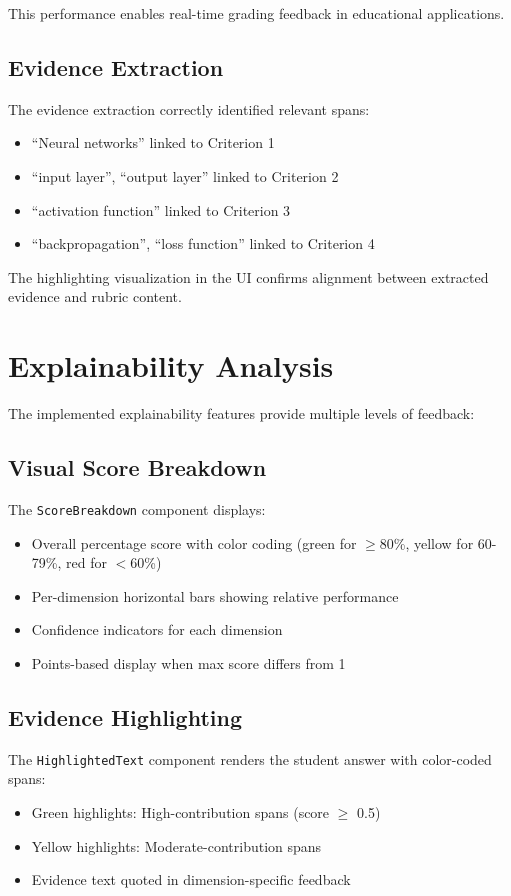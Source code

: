 \documentclass[conference]{IEEEtran}
\begin{document}
This performance enables real-time grading feedback in educational applications.

\subsection{Evidence Extraction}
The evidence extraction correctly identified relevant spans:
\begin{itemize}
    \item ``Neural networks'' linked to Criterion 1
    \item ``input layer'', ``output layer'' linked to Criterion 2
    \item ``activation function'' linked to Criterion 3
    \item ``backpropagation'', ``loss function'' linked to Criterion 4
\end{itemize}

The highlighting visualization in the UI confirms alignment between extracted evidence and rubric content.

\section{Explainability Analysis}
The implemented explainability features provide multiple levels of feedback:

\subsection{Visual Score Breakdown}
The \texttt{ScoreBreakdown} component displays:
\begin{itemize}
    \item Overall percentage score with color coding (green for $\geq$80\%, yellow for 60-79\%, red for $<$60\%)
    \item Per-dimension horizontal bars showing relative performance
    \item Confidence indicators for each dimension
    \item Points-based display when max score differs from 1
\end{itemize}

\subsection{Evidence Highlighting}
The \texttt{HighlightedText} component renders the student answer with color-coded spans:
\begin{itemize}
    \item Green highlights: High-contribution spans (score $\geq$ 0.5)
    \item Yellow highlights: Moderate-contribution spans
    \item Evidence text quoted in dimension-specific feedback
\end{itemize}
\end{document}
